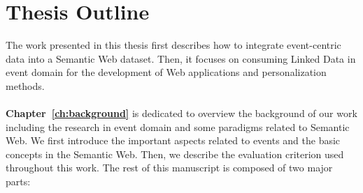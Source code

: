 \section{Thesis Outline}      \label{sec:structure}
The work presented in this thesis first describes how to integrate event-centric data into a Semantic Web dataset. Then, it focuses on consuming Linked Data in event domain for the development of Web applications and personalization methods. 
\\
\\
\noindent \textbf{Chapter~\ref{ch:background}} is dedicated to overview the background of our work including the research in event domain and some paradigms related to Semantic Web. We first introduce the important aspects related to events and the basic concepts in the Semantic Web. Then, we describe the evaluation criterion used throughout this work. The rest of this manuscript is composed of two major parts:

